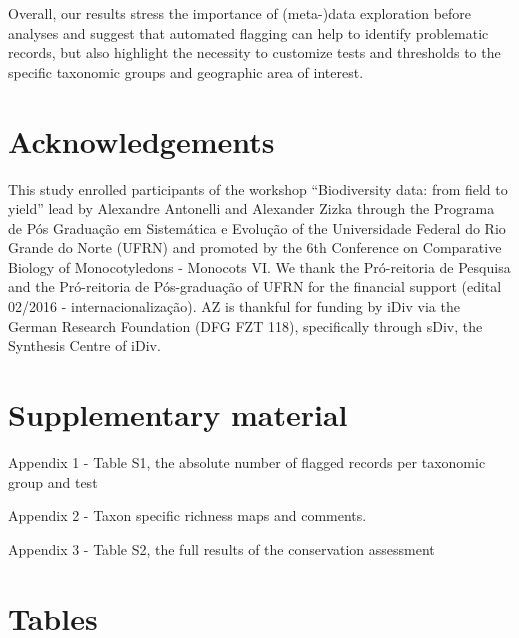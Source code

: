 \documentclass[
  12pt,
]{article}
\begin{document}
Overall, our results stress the importance of (meta-)data exploration before analyses and suggest that automated flagging can help to identify problematic records, but also highlight the necessity to customize tests and thresholds to the specific taxonomic groups and geographic area of interest.

\hypertarget{acknowledgements}{%
\section{Acknowledgements}\label{acknowledgements}}

This study enrolled participants of the workshop ``Biodiversity data: from field to yield'' lead by Alexandre Antonelli and Alexander Zizka through the Programa de Pós Graduação em Sistemática e Evolução of the Universidade Federal do Rio Grande do Norte (UFRN) and promoted by the 6th Conference on Comparative Biology of Monocotyledons - Monocots VI. We thank the Pró-reitoria de Pesquisa and the Pró-reitoria de Pós-graduação of UFRN for the financial support (edital 02/2016 - internacionalização). AZ is thankful for funding by iDiv via the German Research Foundation (DFG FZT 118), specifically through sDiv, the Synthesis Centre of iDiv.

\hypertarget{supplementary-material}{%
\section{Supplementary material}\label{supplementary-material}}

Appendix 1 - Table S1, the absolute number of flagged records per taxonomic group and test

Appendix 2 - Taxon specific richness maps and comments.

Appendix 3 - Table S2, the full results of the conservation assessment

\newpage{}

\hypertarget{tables}{%
\section{Tables}\label{tables}}
\end{document}
